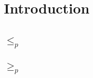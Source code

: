 \begin{abstract}

\end{abstract}

\section{Introduction}


\section{\Problem{}}

	\subsection{\Prob{} $\leq_p$ \ProbGroup{}}
	
	\subsection{\Prob{} $\geq_p$ \ProbGroup{}}
	

\section{\ProblemStar{}}



